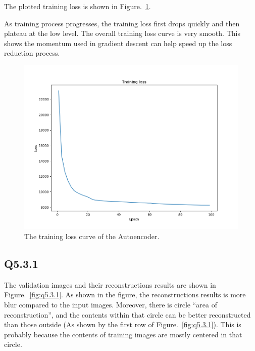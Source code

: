 \documentclass[11pt]{article}
\begin{document}
The plotted training loss is shown in Figure.~\ref{fig:q5.2}.

As training process progresses, the training loss first drops quickly and then plateau at the low level. The overall training loss curve is very smooth.
This shows the momentum used in gradient descent can help speed up the loss reduction process.

\begin{figure}[h!]
    \centering
    \includegraphics[width=.8\linewidth]{../results/q5_2.png}
    \caption{The training loss curve of the Autoencoder. }
    \label{fig:q5.2}
\end{figure}

\newpage

\subsection*{Q5.3.1}

The validation images and their reconstructions results are shown in Figure.~\ref{fig:q5.3.1}. As shown in the figure, the reconstructions results is more blur compared to the input images. Moreover, there is circle ``area of reconstruction'', and the contents within that circle can be better reconstructed than those outside (As shown by the first row of Figure.~\ref{fig:q5.3.1}). This is probably because the contents of training images are mostly centered in that circle.
\end{document}
